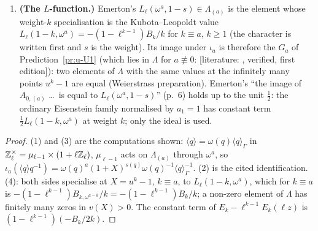 \documentclass[11pt]{article}
\newcommand{\LIT}[1]{\textsf{[literature: #1]}}   %
\newcommand{\Iw}{\Lambda}                         %
\newcommand{\hcusp}{\mathbf{h}}                   %
\newcommand{\ee}{\epsilon}                        %
\newcommand{\Zl}{\Z_\ell}
\begin{document}
\begin{lemma}
\begin{enumerate}
  \[
    I^{0}(a):=\bigl(T(q)-\ee_q\ (q\ne\ell),\ U-1\bigr)\subseteq\hcusp(a).
  \]
\item \textbf{(The $L$-function.)} Emerton's $L_\ell(\omega^{a},1-s)\in\Iw_{(a)}$ is the element whose weight-$k$ specialisation is the Kubota--Leopoldt value
  $L_\ell(1-k,\omega^{a})=-(1-\ell^{k-1})B_k/k$ for $k\equiv a$, $k\ge1$ (the character is written first and $s$ is the weight). Its image under $\iota_a$ is
  therefore the $G_a$ of Prediction~\ref{pr:u-U1} (which lies in $\Iw$ for $a\not\equiv0$: \LIT{\cite[{Thm.~7.10, p.~123, with the power series $f(T,\theta)\in\mathcal O_\theta[[T]]$
  of p.~122 for $\theta=\omega^{a}\ne1$}]{washington1st}, verified, first edition}): two elements of $\Iw$ with the same values at the infinitely many points $u^{k}-1$ are equal (Weierstrass
  preparation). Emerton's ``the image of $A_{0,(a)}$ \dots\ is equal to $L_\ell(\omega^{a},1-s)$'' (p.~6) holds up to the unit $\tfrac12$: the ordinary
  Eisenstein family normalised by $a_1=1$ has constant term $\tfrac12L_\ell(1-k,\omega^{a})$ at weight $k$; only the ideal is used.
\end{enumerate}
\end{lemma}

\begin{proof}
(1) and (3) are the computations shown: $\langle q\rangle=\omega(q)\langle q\rangle_\Gamma$ in $\Zl^\times=\mu_{\ell-1}\times(1+\ell\Zl)$, $\mu_{\ell-1}$ acts on
$\Iw_{(a)}$ through $\omega^{a}$, so $\iota_a(\langle q\rangle q^{-1})=\omega(q)^{a}(1+X)^{s(q)}\omega(q)^{-1}\langle q\rangle_\Gamma^{-1}$. (2) is the cited
identification. (4): both sides specialise at $X=u^{k}-1$, $k\equiv a$, to $L_\ell(1-k,\omega^{a})$, which for $k\equiv a$ is $-(1-\ell^{k-1})B_{k,\omega^{a-k}}/k=
-(1-\ell^{k-1})B_k/k$; a non-zero element of $\Iw$ has finitely many zeros in $v(X)>0$. The constant term of $E_k-\ell^{k-1}E_k(\ell z)$ is
$(1-\ell^{k-1})(-B_k/2k)$.
\end{proof}
\end{document}
